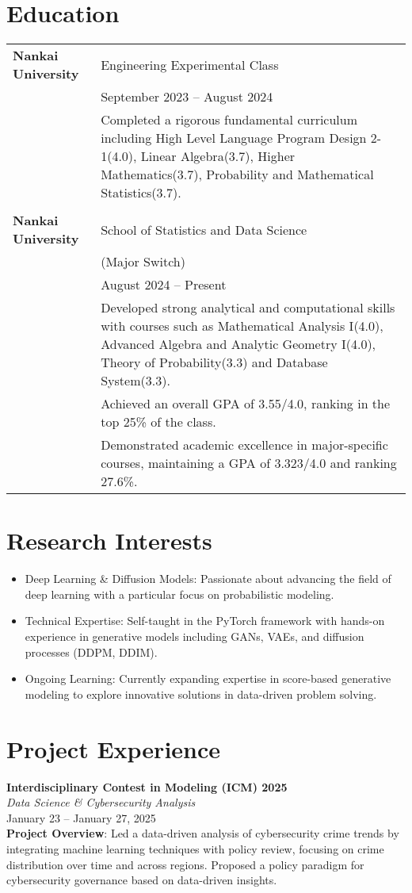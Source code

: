 \documentclass{article}
\begin{document}
\section{Education}
\begin{tabular}{p{3cm}p{11cm}}
    \textbf{Nankai University} & Engineering Experimental Class \\
    & September 2023 -- August 2024 \\
    & Completed a rigorous fundamental curriculum including High Level Language Program Design 2-1(4.0), Linear Algebra(3.7), Higher Mathematics(3.7), Probability and Mathematical Statistics(3.7). \\
    \\
    \textbf{Nankai University} & School of Statistics and Data Science \\
    & (Major Switch) \\
    & August 2024 -- Present \\
    & Developed strong analytical and computational skills with courses such as Mathematical Analysis I(4.0), Advanced Algebra and Analytic Geometry I(4.0), Theory of Probability(3.3) and Database System(3.3). \\
    & Achieved an overall GPA of 3.55/4.0, ranking in the top 25\% of the class. \\
    & Demonstrated academic excellence in major-specific courses, maintaining a GPA of 3.323/4.0 and ranking 27.6\%.
\end{tabular}

\section{Research Interests}
\begin{itemize}[leftmargin=1.5em]
    \item Deep Learning \& Diffusion Models: Passionate about advancing the field of deep learning with a particular focus on probabilistic modeling.
    \item Technical Expertise: Self-taught in the PyTorch framework with hands-on experience in generative models including GANs, VAEs, and diffusion processes (DDPM, DDIM).
    \item Ongoing Learning: Currently expanding expertise in score-based generative modeling to explore innovative solutions in data-driven problem solving.
\end{itemize}

\section{Project Experience}
\textbf{Interdisciplinary Contest in Modeling (ICM) 2025} \\
\textit{Data Science \& Cybersecurity Analysis} \\
January 23 -- January 27, 2025 \\
\textbf{Project Overview}: Led a data-driven analysis of cybersecurity crime trends by integrating machine learning techniques with policy review, focusing on crime distribution over time and across regions. Proposed a policy paradigm for cybersecurity governance based on data-driven insights.
\end{document}
